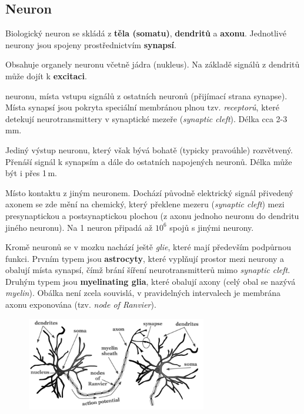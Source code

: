 \documentclass[11pt]{report} %
\begin{document}
\subsection{Neuron}
Biologický neuron se skládá z \textbf{těla (somatu)}, \textbf{dendritů} a \textbf{axonu}. Jednotlivé neurony jsou spojeny prostřednictvím \textbf{synapsí}.
\begin{description}
	\leftskip 40pt
	\setlength{\itemsep}{0pt}
	\item[tělo (soma)] Obsahuje organely neuronu včetně jádra (nukleus). Na základě signálů z dendritů může dojít k \textbf{excitaci}.
	\item[dendrity]  neuronu, místa vstupu signálů z ostatních neuronů (přijímací strana synapse). Místa synapsí jsou pokryta speciální membránou plnou tzv. \textit{receptorů}, které detekují neurotransmittery v synaptické mezeře (\textit{synaptic cleft}). Délka cca 2-3\,mm.
	\item[axon] Jediný výstup neuronu, který však bývá bohatě (typicky pravoúhle) rozvětvený. Přenáší signál k synapsím a dále do ostatních napojených neuronů. Délka může být i přes 1\,m.
	\item[synapse] Místo kontaktu z jiným neuronem. Dochází původně elektrický signál přivedený axonem se zde mění na chemický, který překlene mezeru (\textit{synaptic cleft}) mezi presynaptickou a postsynaptickou plochou (z axonu jednoho neuronu do dendritu jiného neuronu). Na 1 neuron připadá až $10^6$ spojů s jinými neurony.
\end{description}

Kromě neuronů se v mozku nachází ještě \textit{glie}, které mají především podpůrnou funkci. Prvním typem jsou \textbf{astrocyty}, které vyplňují prostor mezi neurony a obalují místa synapsí, čímž brání šíření neurotransmitterů mimo \textit{synaptic cleft}. Druhým typem jsou \textbf{myelinating glia}, které obalují axony (celý obal se nazývá \textit{myelin}). Obálka není zcela souvislá, v pravidelných intervalech je membrána axonu exponována (tzv. \textit{node of Ranvier}).

\begin{figure}[H]
	\centering
	\includegraphics[width=0.7\textwidth]{img/neuron.png}
\end{figure}
\end{document}
